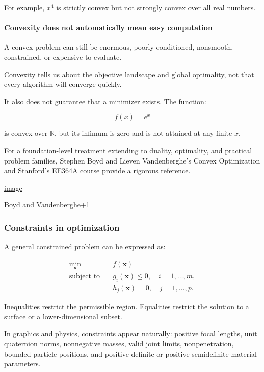 For example, \(x^4\) is strictly convex but not strongly convex over all real numbers.

\paragraph{Convexity does not automatically mean easy computation}\label{02-foundations-ii-ch026-convexity-does-not-automatically-mean-easy-computation}

A convex problem can still be enormous, poorly conditioned, nonsmooth, constrained, or expensive to evaluate.

Convexity tells us about the objective landscape and global optimality, not that every algorithm will converge quickly.

It also does not guarantee that a minimizer exists. The function:

\[
f(x)=e^x
\]

is convex over \(\mathbb R\), but its infimum is zero and is not attained at any finite \(x\).

For a foundation-level treatment extending to duality, optimality, and practical problem families, Stephen Boyd and Lieven Vandenberghe's Convex Optimization and Stanford's \href{https://web.stanford.edu/class/ee364a/?utm_source=chatgpt.com}{EE364A course} provide a rigorous reference. 

\href{https://www.google.com/s2/favicons?domain=https://stanford.edu&sz=32}{image}

Boyd and Vandenberghe+1

\subsubsection{Constraints in optimization}\label{02-foundations-ii-ch026-constraints-in-optimization}

A general constrained problem can be expressed as:

\[
\begin{aligned} \min_{\mathbf x}\quad &f(\mathbf x)\\ \text{subject to}\quad &g_i(\mathbf x)\le0,\quad i=1,\ldots,m,\\ &h_j(\mathbf x)=0,\quad j=1,\ldots,p. \end{aligned}
\]

Inequalities restrict the permissible region. Equalities restrict the solution to a surface or a lower-dimensional subset.

In graphics and physics, constraints appear naturally: positive focal lengths, unit quaternion norms, nonnegative masses, valid joint limits, nonpenetration, bounded particle positions, and positive-definite or positive-semidefinite material parameters.

